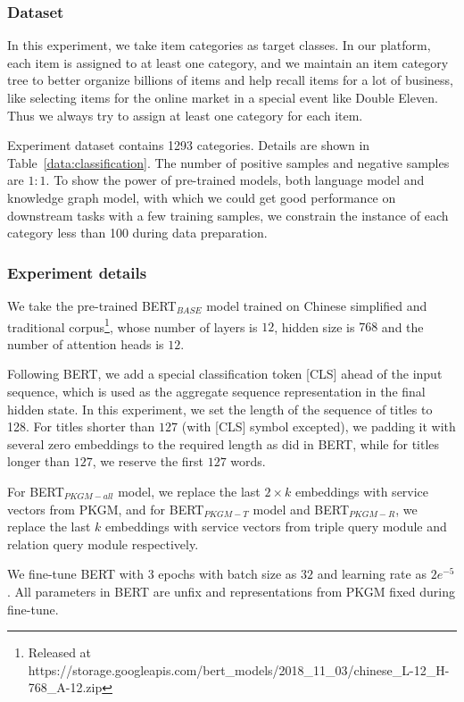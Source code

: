 \subsubsection{Dataset}
In this experiment, we take item categories as target classes. In our platform, each item is assigned to at least one category, and we maintain an item category tree to better organize billions of items and help recall items for a lot of business, like selecting items for the online market in a special event like Double Eleven. Thus we always try to assign at least one category for each item. 

Experiment dataset contains 1293 categories. Details are shown in Table~\ref{data:classification}. The number of positive samples and negative samples are $1:1$. To show the power of pre-trained models, both language model and knowledge graph model, with which we could get good performance on downstream tasks with a few training samples, we constrain the instance of each category less than 100 during data preparation.



\subsubsection{Experiment details}
We take the pre-trained BERT$_{BASE}$ model trained on Chinese simplified and traditional corpus\footnote{Released at https://storage.googleapis.com/bert\_models/2018\_11\_03/chinese\_L-12\_H-768\_A-12.zip}, whose number of layers is $12$, hidden size is $768$ and the number of attention heads is $12$. 

Following BERT, we add a special classification token [CLS] ahead of the input sequence, which is used as the aggregate sequence representation in the final hidden state. In this experiment, we set the length of the sequence of titles to 128. For titles shorter than $127$ (with [CLS] symbol excepted), we padding it with several zero embeddings to the required length as did in BERT, while for titles longer than $127$, we reserve the first $127$ words.

For BERT$_{PKGM-all}$ model, we replace the last $2\times k$ embeddings with service vectors from PKGM,  and for  BERT$_{PKGM-T}$ model and BERT$_{PKGM-R}$, we replace the last $k$ embeddings with service vectors from triple query module and relation query module respectively.

We fine-tune BERT with $3$ epochs with batch size as $32$ and learning rate as $2e^{-5}$. All parameters in BERT are unfix and representations from PKGM fixed during fine-tune.

